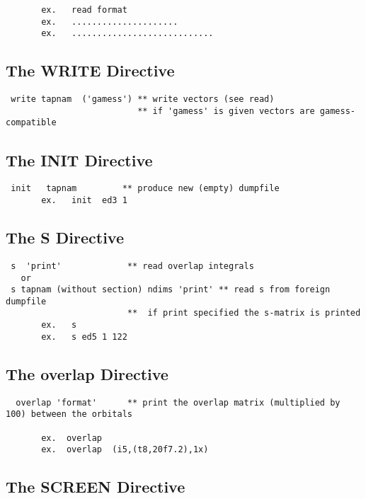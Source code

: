\documentclass[11pt,fleqn]{article}
\begin{document}
{
\footnotesize
\begin{verbatim} 
       ex.   read format
       ex.   .....................
       ex.   ............................
\end{verbatim}
}

\subsection{The WRITE Directive}

{
\footnotesize
\begin{verbatim} 
 write tapnam  ('gamess') ** write vectors (see read)
                          ** if 'gamess' is given vectors are gamess-compatible
\end{verbatim}
}

\subsection{The INIT Directive}

{
\footnotesize
\begin{verbatim} 
 init   tapnam         ** produce new (empty) dumpfile
       ex.   init  ed3 1
\end{verbatim}
}

\subsection{The S Directive}

{
\footnotesize
\begin{verbatim} 
 s  'print'             ** read overlap integrals 
   or
 s tapnam (without section) ndims 'print' ** read s from foreign dumpfile
                        **  if print specified the s-matrix is printed
       ex.   s  
       ex.   s ed5 1 122
\end{verbatim}
}

\subsection{The overlap Directive}

{
\footnotesize
\begin{verbatim} 
  overlap 'format'      ** print the overlap matrix (multiplied by 100) between the orbitals

       ex.  overlap
       ex.  overlap  (i5,(t8,20f7.2),1x)

\end{verbatim}
}


\subsection{The SCREEN Directive}
\end{document}
